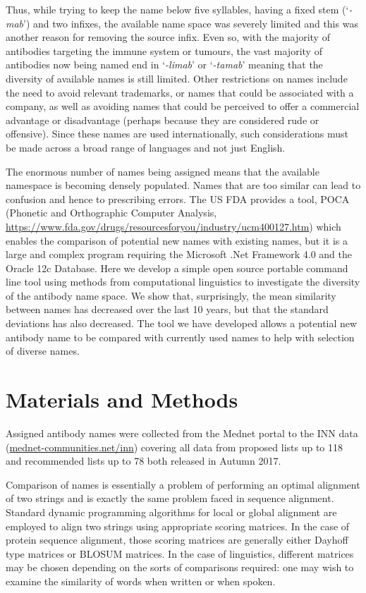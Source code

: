 \documentclass{article}
\newcommand{\eg}[1]{\mbox{`\emph{#1}'}}
\begin{document}
Thus, while trying to keep the name below five syllables, having a
fixed stem (\eg{-mab}) and two infixes, the available name space was
severely limited and this was another reason for removing the source
infix. Even so, with the majority of antibodies targeting the immune
system or tumours, the vast majority of antibodies now being named end
in \eg{-limab} or \eg{-tamab} meaning that the diversity of available
names is still limited. Other restrictions on names include the need
to avoid relevant trademarks, or names that could be associated with a
company, as well as avoiding names that could be perceived to offer a
commercial advantage or disadvantage (perhaps because they are
considered rude or offensive). Since these names are used
internationally, such considerations must be made across a broad range
of languages and not just English.


The enormous number of names being assigned means that the available
namespace is becoming densely populated. Names that are too similar
can lead to confusion and hence to prescribing errors.  The US FDA
provides a tool, POCA (Phonetic and Orthographic Computer Analysis,
\url{https://www.fda.gov/drugs/resourcesforyou/industry/ucm400127.htm})
which enables the comparison of potential new names with existing
names, but it is a large and complex program requiring the Microsoft
.Net Framework 4.0 and the Oracle 12c Database.  Here we develop a
simple open source portable command line tool using methods from
computational linguistics to investigate the diversity of the antibody
name space. We show that, surprisingly, the mean similarity between
names has decreased over the last 10 years, but that the standard
deviations has also decreased.  The tool we have developed allows a
potential new antibody name to be compared with currently used names
to help with selection of diverse names.

\section{Materials and Methods}
Assigned antibody names were collected from the Mednet portal to the
INN data (\url{mednet-communities.net/inn}) covering all data from
proposed lists up to 118 and recommended lists up to 78 both released
in Autumn 2017.

Comparison of names is essentially a problem of performing an optimal
alignment of two strings and is exactly the same problem faced in
sequence alignment. Standard dynamic programming algorithms for
local\cite{sw:alignment} or global\cite{nw:alignment} alignment are
employed to align two strings using appropriate scoring matrices. In
the case of protein sequence alignment, those scoring matrices are
generally either Dayhoff type matrices\cite{dayhoff:mdm78} or BLOSUM
matrices\cite{henikoff:blosum}. In the case of linguistics, different
matrices may be chosen depending on the sorts of comparisons required:
one may wish to examine the similarity of words when written or when
spoken.
\end{document}
